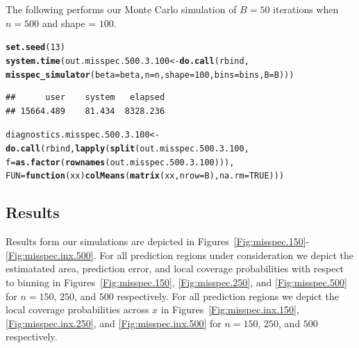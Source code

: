 \documentclass[11pt]{article}\usepackage[]{graphicx}\usepackage[]{color}
\makeatletter
\newcommand{\hlnum}[1]{\textcolor[rgb]{0.686,0.059,0.569}{#1}}%
\newcommand{\hlstd}[1]{\textcolor[rgb]{0.345,0.345,0.345}{#1}}%
\newcommand{\hlkwa}[1]{\textcolor[rgb]{0.161,0.373,0.58}{\textbf{#1}}}%
\newcommand{\hlkwb}[1]{\textcolor[rgb]{0.69,0.353,0.396}{#1}}%
\newcommand{\hlkwc}[1]{\textcolor[rgb]{0.333,0.667,0.333}{#1}}%
\newcommand{\hlkwd}[1]{\textcolor[rgb]{0.737,0.353,0.396}{\textbf{#1}}}%
\newenvironment{kframe}{%
 \def\at@end@of@kframe{}%
 \ifinner\ifhmode%
  \def\at@end@of@kframe{\end{minipage}}%
  \begin{minipage}{\columnwidth}%
 \fi\fi%
 \def\FrameCommand##1{\hskip\@totalleftmargin \hskip-\fboxsep
 \colorbox{shadecolor}{##1}\hskip-\fboxsep
     \hskip-\linewidth \hskip-\@totalleftmargin \hskip\columnwidth}%
 \MakeFramed {\advance\hsize-\width
   \@totalleftmargin\z@ \linewidth\hsize
   \@setminipage}}%
 {\par\unskip\endMakeFramed%
 \at@end@of@kframe}
\newenvironment{knitrout}{}{} %
\makeatother
\begin{document}
The following performs our Monte Carlo simulation of $B = 50$ iterations 
when $n = 500$ and shape = $100$.

\begin{knitrout}
\color{fgcolor}\begin{kframe}
\begin{alltt}
\hlkwd{set.seed}\hlstd{(}\hlnum{13}\hlstd{)}
\hlkwd{system.time}\hlstd{(out.misspec.500.3.100} \hlkwb{<-} \hlkwd{do.call}\hlstd{(rbind,}
  \hlkwd{misspec_simulator}\hlstd{(}\hlkwc{beta} \hlstd{= beta,} \hlkwc{n} \hlstd{= n,} \hlkwc{shape} \hlstd{=} \hlnum{100}\hlstd{,} \hlkwc{bins} \hlstd{= bins,} \hlkwc{B} \hlstd{= B)))}
\end{alltt}
\begin{verbatim}
##      user    system   elapsed 
## 15664.489    81.434  8328.236
\end{verbatim}
\begin{alltt}
\hlstd{diagnostics.misspec.500.3.100} \hlkwb{<-} \hlkwd{do.call}\hlstd{(rbind,} \hlkwd{lapply}\hlstd{(}\hlkwd{split}\hlstd{(out.misspec.500.3.100,}
  \hlkwc{f} \hlstd{=} \hlkwd{as.factor}\hlstd{(}\hlkwd{rownames}\hlstd{(out.misspec.500.3.100))),}
  \hlkwc{FUN} \hlstd{=} \hlkwa{function}\hlstd{(}\hlkwc{xx}\hlstd{)} \hlkwd{colMeans}\hlstd{(}\hlkwd{matrix}\hlstd{(xx,} \hlkwc{nrow} \hlstd{= B),} \hlkwc{na.rm} \hlstd{=} \hlnum{TRUE}\hlstd{)))}
\end{alltt}
\end{kframe}
\end{knitrout}






\newpage
\subsection{Results}
\label{sec:misspec-Results}

Results form our simulations are depicted in 
Figures~\ref{Fig:misspec.150}-\ref{Fig:misspec.inx.500}.  
For all prediction regions under consideration we depict the estimatated 
area, prediction error, and local coverage probabilities with respect to 
binning in Figures~\ref{Fig:misspec.150}, \ref{Fig:misspec.250}, and 
\ref{Fig:misspec.500} for $n = 150$, $250$, and $500$ respectively.  For all 
prediction regions we depict the local coverage probabilities across $x$ 
in Figures~\ref{Fig:misspec.inx.150}, \ref{Fig:misspec.inx.250}, and 
\ref{Fig:misspec.inx.500} for $n = 150$, $250$, and $500$ respectively.
\end{document}
